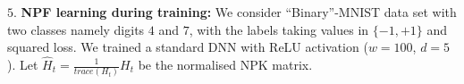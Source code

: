 $5.$ \textbf{NPF learning during training:} We consider ``Binary''-MNIST data set with two classes namely digits $4$ and $7$, with the labels taking values in $\{-1,+1\}$ and squared loss. We trained a standard DNN with ReLU activation ($w=100$, $d=5$). Let $\widehat{H}_t=\frac{1}{trace(H_t)}H_t$ be the normalised NPK matrix. 

